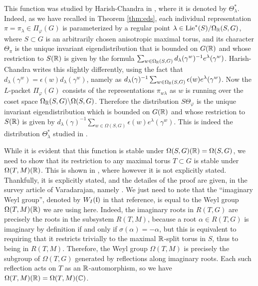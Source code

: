 \documentclass{article}
\theoremstyle{definition}
\numberwithin{equation}{section}
\renewcommand{\-}{\hyp{}}
\begin{document}
This function was studied by Harish-Chandra in \cite[\S24]{HCDSI}, where it is denoted by $\Theta_\lambda^*$. Indeed, as we have recalled in Theorem \ref{thm:eds}, each individual representation $\pi=\pi_\lambda \in \Pi_\varphi(G)$ is parameterized by a regular point $\lambda \in \textrm{Lie}^*(S)/\Omega_{\mathbb{R}}(S,G)$, where $S \subset G$ is an arbitrarily chosen anisotropic maximal torus, and its character $\Theta_\pi$ is the unique invariant eigendistribution that is bounded on $G(\mathbb{R})$ and whose restriction to $S(\mathbb{R})$ is given by the formula $\sum_{w \in \Omega_{\mathbb{R}}(S,G)} d_\lambda(\gamma^w)^{-1}e^\lambda(\gamma^w)$. Harish-Chandra writes this slightly differently, using the fact that $d_\lambda(\gamma^w)=\epsilon(w)d_\lambda(\gamma^w)$, namely as $d_\lambda(\gamma)^{-1}\sum_{w \in \Omega_{\mathbb{R}}(S,G)} \epsilon(w)e^\lambda(\gamma^w)$. Now the $L$-packet $\Pi_\varphi(G)$ consists of the representations $\pi_{w\lambda}$ as $w$ is running over the coset space $\Omega_{\mathbb{R}}(S,G) \backslash \Omega(S,G)$. Therefore the distribution $S\Theta_\varphi$ is the unique invariant eigendistribution which is bounded on $G(\mathbb{R})$ and whose restriction to $S(\mathbb{R})$ is given by $d_\lambda(\gamma)^{-1}\sum_{w \in \Omega(S,G)} \epsilon(w)e^\lambda(\gamma^w)$. This is indeed the distribution $\Theta_\lambda^*$ studied in \cite[\S24]{HCDSI}.

While it is evident that this function is stable under $\Omega(S,G)(\mathbb{R})=\Omega(S,G)$, we need to show that its restriction to any maximal torus $T \subset G$ is stable under $\Omega(T,M)(\mathbb{R})$. This is shown in \cite[\S24]{HCDSI}, where however it is not explicitly stated. Thankfully, it is explicitly stated, and the detailes of the proof are given, in the survey article of Varadarajan, namely \cite[\S3.6, Theorem 1]{Varadarajan73}. We just need to note that the ``imaginary Weyl group'', denoted by $W_I(\mathfrak{l})$ in that reference, is equal to the Weyl group $\Omega(T,M)(\mathbb{R})$ we are using here. Indeed, the imaginary roots in $R(T,G)$ are precisely the roots in the subsystem $R(T,M)$, because a root $\alpha \in R(T,G)$ is imaginary by definition if and only if $\sigma(\alpha)=-\alpha$, but this is equivalent to requiring that it restricts trivially to the maximal $\mathbb{R}$-split torus in $S$, thus to being in $R(T,M)$. Therefore, the Weyl group $\Omega(T,M)$ is precisely the subgroup of $\Omega(T,G)$ generated by reflections along imaginary roots. Each such reflection acts on $T$ as an $\mathbb{R}$-automorphism, so we have $\Omega(T,M)(\mathbb{R})=\Omega(T,M)(\mathbb{C})$.
\end{document}
